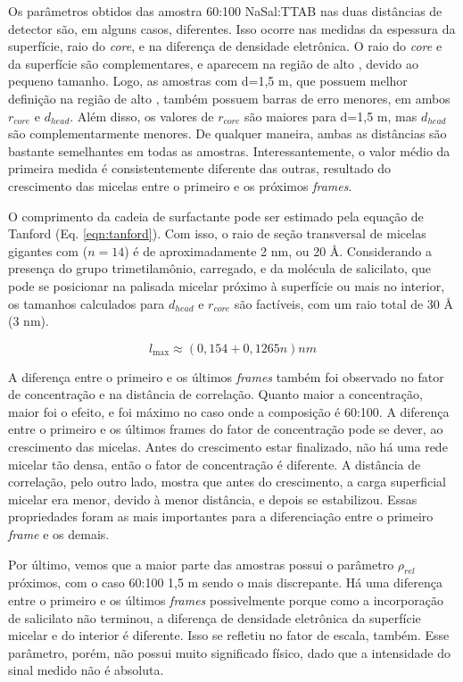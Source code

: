 	Os parâmetros obtidos das amostra 60:100 NaSal:TTAB nas duas distâncias de detector são, em alguns casos, diferentes. Isso ocorre nas medidas da espessura da superfície, raio do \emph{core}, e na diferença de densidade eletrônica. O raio do \emph{core} e da superfície são complementares, e aparecem na região de alto \q, devido ao pequeno tamanho. Logo, as amostras com d=1,5 m, que possuem melhor definição na região de alto \q, também possuem barras de erro menores, em ambos \(r_{core}\) e \(d_{head}\). Além disso, os valores de \(r_{core}\) são maiores para d=1,5 m, mas \(d_{head}\) são complementarmente menores. De qualquer maneira, ambas as distâncias são bastante semelhantes em todas as amostras. Interessantemente, o valor médio da primeira medida é consistentemente diferente das outras, resultado do crescimento das micelas entre o primeiro e os próximos \emph{frames}.
	
	O comprimento da cadeia de surfactante pode ser estimado pela equação de Tanford (Eq. \ref{eqn:tanford}). Com isso, o raio de seção transversal de micelas gigantes com \TTAB{} (\(n=14\)) é de aproximadamente 2 nm, ou 20 \AA. Considerando a presença do grupo trimetilamônio, carregado, e da molécula de salicilato, que pode se posicionar na palisada micelar próximo à superfície ou mais no interior, os tamanhos calculados para \(d_{head}\) e \(r_{core}\) são factíveis, com um raio total de 30 \AA{} (3 nm).
	
	\begin{equation}
		l_\mathrm{max} \approx (0,154 + 0,1265n) nm
		\label{eqn:tanford}
	\end{equation}
	
	A diferença entre o primeiro e os últimos \emph{frames} também foi observado no fator de concentração e na distância de correlação. Quanto maior a concentração, maior foi o efeito, e foi máximo no caso onde a composição é 60:100. A diferença entre o primeiro e os últimos frames do fator de concentração pode se dever, ao crescimento das micelas. Antes do crescimento estar finalizado, não há uma rede micelar tão densa, então o fator de concentração é diferente. A distância de correlação, pelo outro lado, mostra que antes do crescimento, a carga superficial micelar era menor, devido à menor distância, e depois se estabilizou. Essas propriedades foram as mais importantes para a diferenciação entre o primeiro \emph{frame} e os demais.
	
	Por último, vemos que a maior parte das amostras possui o parâmetro \(\rho_{rel}\) próximos, com o caso 60:100 1,5 m sendo o mais discrepante. Há uma diferença entre o primeiro e os últimos \emph{frames} possivelmente porque como a incorporação de salicilato não terminou, a diferença de densidade eletrônica da superfície micelar e do interior é diferente. Isso se refletiu no fator de escala, também. Esse parâmetro, porém, não possui muito significado físico, dado que a intensidade do sinal medido não é absoluta.
	
